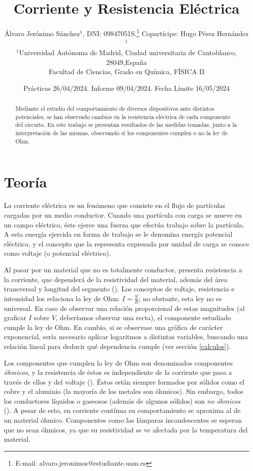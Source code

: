 \documentclass[fleqn,usenatbib,openbib]{mnras}
\title[Estudio de la Corriente y Resistencia Eléctrica]{Corriente y Resistencia Eléctrica}
\author[Álvaro Jerónimo Sánchez]{
Álvaro Jerónimo Sánchez$^{1}$, DNI: 09847051S.\thanks{E-mail: alvaro.jeronimos@estudiante.uam.es}
Copartícipe: Hugo Pérez Hernández$^{1}$
\\
$^{1}$Universidad Autónoma de Madrid, Ciudad universitaria de Cantoblanco, 28049,España \\
Facultad de Ciencias, Grado en Química, FÍSICA II
}
\date{Prácticas 26/04/2024. Informe 09/04/2024. Fecha Límite 16/05/2024}
\begin{document}
\label{firstpage}
\pagerange{\pageref{firstpage}--\pageref{lastpage}}
\maketitle


\begin{abstract}

Mediante el estudio del comportamiento de diversos dispositivos ante distintos potenciales, se han observado cambios en la resistencia eléctrica de cada componente del circuito. En este trabajo se presentan resultados de las medidas tomadas, junto a la interpretación de las mismas, observando si los componentes cumplen o no la ley de Ohm.

\vspace{1cm}
\end{abstract}

\section{Teoría}

La corriente eléctrica es un fenómeno que consiste en el flujo de partículas cargadas por un medio conductor. Cuando una partícula con carga se mueve en un campo eléctrico, éste ejerce una fuerza que efectúa trabajo sobre la partícula. A esta energía ejercida en forma de trabajo se le denomina energía potencial eléctrica, y el concepto que la representa expresada por unidad de carga se conoce como voltaje (o potencial eléctrico).

Al pasar por un material que no es totalmente conductor, presenta resistencia a la corriente, que dependerá de la resistividad del material, además del área transversal y longitud del segmento (\cite{Sears}). Los conceptos de voltaje, resistencia e intensidad los relaciona la ley de Ohm: $I=\frac{V}{R}$; no obstante, esta ley no es universal. En caso de observar una relación proporcional de estas magnitudes (al graficar $I$ sobre $V$, deberíamos observar una recta), el componente estudiado cumple la ley de Ohm.  En cambio, si se observase una gráfica de carácter exponencial, sería necesario aplicar logaritmos a distintas variables, buscando una relación lineal para deducir qué dependencia cumple (ver sección \ref{calculos}).

Los componentes que cumplen la ley de Ohm son denominados componentes \textit{óhmicos}, y la resistencia de éstos es independiente de la corriente que pasa a través de ellos y del voltaje (\cite{Ohm}). Éstos están siempre formados por sólidos como el cobre y el aluminio (la mayoría de los metales son óhmicos). Sin embargo, todos los conductores líquidos o gaseosos (además de algunos sólidos) son \textit{no óhmicos} (\cite{elec}). A pesar de esto, en corriente contínua su comportamiento se aproxima al de un material óhmico. Componentes como las lámparas incandescentes se esperan que no sean óhmicos, ya que su resistividad se ve afectada por la temperatura del material.
\end{document}
